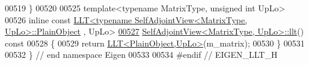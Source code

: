 \begin{DoxyCode}
00519 \}
00520 
00525 \textcolor{keyword}{template}<\textcolor{keyword}{typename} MatrixType, \textcolor{keywordtype}{unsigned} \textcolor{keywordtype}{int} UpLo>
00526 \textcolor{keyword}{inline} \textcolor{keyword}{const} \hyperlink{group___cholesky___module_class_eigen_1_1_l_l_t}{LLT<typename SelfAdjointView<MatrixType, UpLo>::PlainObject}
      , UpLo>
\hyperlink{group___core___module_a405e810491642a7f7b785f2ad6f93619}{00527} \hyperlink{group___core___module_a405e810491642a7f7b785f2ad6f93619}{SelfAdjointView<MatrixType, UpLo>::llt}()\textcolor{keyword}{ const}
00528 \textcolor{keyword}{}\{
00529   \textcolor{keywordflow}{return} \hyperlink{group___cholesky___module_class_eigen_1_1_l_l_t}{LLT<PlainObject,UpLo>}(m\_matrix);
00530 \}
00531 
00532 \} \textcolor{comment}{// end namespace Eigen}
00533 
00534 \textcolor{preprocessor}{#endif // EIGEN\_LLT\_H}
\end{DoxyCode}
